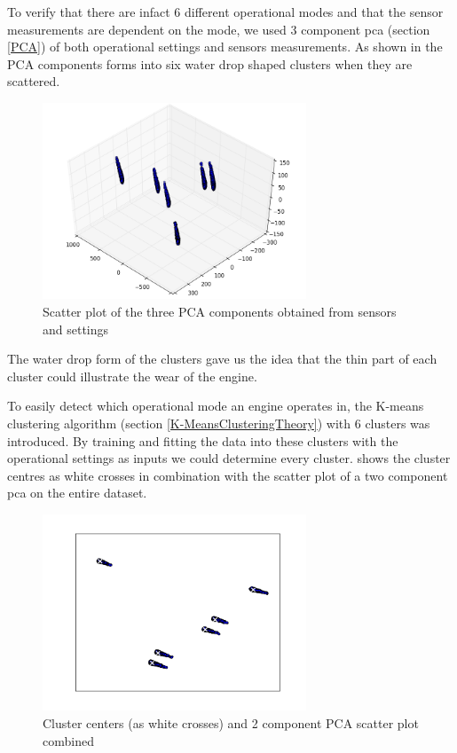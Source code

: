 \documentclass[english, a4paper]{report}
\begin{document}
{{{{                To verify that there are infact 6 different operational modes and that the sensor measurements are dependent on the mode, we used 3 component \gls{pca} (section \ref{PCA}) of both operational settings and sensors measurements. As shown in  the PCA components forms into six water drop shaped clusters when they are scattered.
                
                \begin{figure}[H]
                    \centering \includegraphics[width=0.7\textwidth]{PCA3D}
                    \caption{Scatter plot of the three PCA components obtained from sensors and settings}
                    \label{fig:PCA3D}
                \end{figure}
                
                The water drop form of the clusters gave us the idea that the thin part of each cluster could illustrate the wear of the engine. 
                \par
                To easily detect which operational mode an engine operates in, the K-means clustering algorithm (section \ref{K-MeansClusteringTheory}) with 6 clusters was introduced. By training and fitting the data into these clusters with the operational settings as inputs we could determine every cluster.  shows the cluster centres as white crosses in combination with the scatter plot of a two component \gls{pca} on the entire dataset.
                
                \begin{figure}[H]
                    \centering \includegraphics[width=0.7\textwidth]{K-Means}
                    \caption{Cluster centers (as white crosses) and 2 component PCA scatter plot combined}
                    \label{fig:K-Means}
                \end{figure}
                
}}}}
\end{document}
